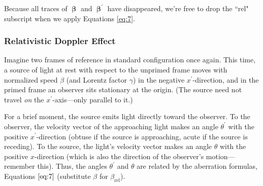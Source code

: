\documentclass[12pt]{article}
\newcommand{\vvbeta}{\bm{\upbeta}}
\begin{document}
Because all traces of $\vvbeta$ and $\vvbeta^{\prime}$ have disappeared, we're free to drop the ``rel" subscript when we apply Equations \ref{eq:7}.


\subsubsection{Relativistic Doppler Effect}\label{sssec:rdf}

Imagine two frames of reference in standard configuration once again. This time, a source of light at rest with respect to the unprimed frame moves with normalized speed $\beta$ (and Lorentz factor $\gamma$) in the negative $x^\prime$-direction, and in the primed frame an observer sits stationary at the origin. (The source need not travel \emph{on} the $x^\prime$-axis---only parallel to it.)

For a brief moment, the source emits light directly toward the observer. To the observer, the velocity vector of the approaching light makes an angle $\theta^\prime$ with the positive $x^\prime$-direction (obtuse if the source is approaching, acute if the source is receding). To the source, the light's velocity vector makes an angle $\theta$ with the positive $x$-direction (which is also the direction of the observer's motion---remember this). Thus, the angles $\theta^\prime$ and $\theta$ are related by the aberration formulas, Equations $\ref{eq:7}$ (substitute $\beta$ for $\beta_{\textrm{rel}}$).
\end{document}

